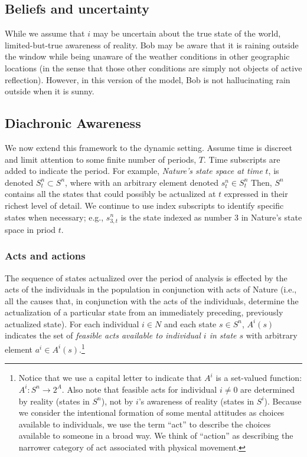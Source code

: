 \documentclass[
11pt,
titlepage,
reqno,
]{article}%
\theoremstyle{definition}
\begin{document}
\subsection{Beliefs and uncertainty}

While we assume that $i$ may be uncertain about the true state of the world,  limited-but-true awareness of reality.
Bob may be aware that it is raining outside the window while being unaware of the weather conditions in other geographic locations (in the sense that those other conditions are simply not objects of active reflection).
However, in this version of the model, Bob is not hallucinating rain outside when it is sunny.	 

\subsection{Diachronic Awareness}\label{sec:diachronic_setup}

We now extend this framework to the dynamic setting.
Assume time is discreet and limit attention to some finite number of periods, $T$. 
Time subscripts are added to indicate the period. For example, \textit{Nature's state space at time} $t$, is denoted $S^n_t\subset S^n$, where with an arbitrary element denoted $s^n_t\in S^n_t$
Then, $S^n$ contains all the states that could possibly be actualized at $t$ expressed in their richest level of detail.
We continue to use index subscripts to identify specific states when necessary; e.g., $s^n_{3,t}$ is the state indexed as number 3 in Nature's state space in priod $t.$


\subsubsection{Acts and actions\label{sec:dynamics}}
The sequence of states actualized over the period of analysis is effected by the acts of the individuals in the population in conjunction with acts of Nature (i.e., all the causes that, in conjunction with the acts of the individuals, determine the actualization of a particular state from an immediately preceding, previously actualized state).
For each individual $i\in N$ and each state $s\in S^n$,  $A^i(s)$ indicates the set of \textit{feasible acts available to individual $i$ in state $s$} with arbitrary element $a^i\in A^i(s)$.\footnote
{
	Notice that we use a capital letter to indicate that $A^i$ is a set-valued function: $A^i:S^n\rightarrow 2^A$.
	Also note that feasible acts for individual $i\ne 0$ are determined by reality (states in $S^n$), not by $i$'s awareness of reality (states in $S^i$).
	Because we consider the intentional formation of some mental attitudes as choices available to individuals, we use the term ``act'' to describe the choices available to someone in a broad way.
	We think of ``action'' as describing the narrower category of act associated with physical movement.
} 
	
\end{document}
